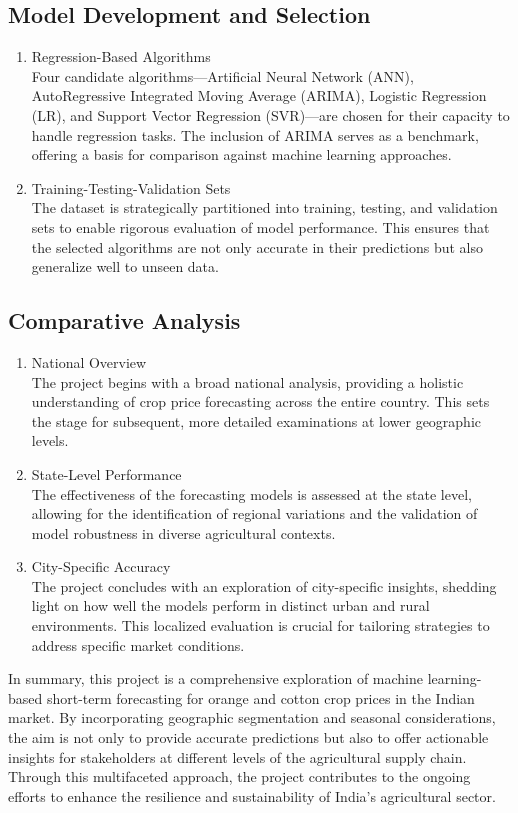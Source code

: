 \subsection{Model Development and Selection}
    \begin{enumerate}
        \item Regression-Based Algorithms\\
            Four candidate algorithms—Artificial Neural Network (ANN), AutoRegressive Integrated Moving Average (ARIMA), Logistic Regression (LR), and Support Vector Regression (SVR)—are chosen for their capacity to handle regression tasks. The inclusion of ARIMA serves as a benchmark, offering a basis for comparison against machine learning approaches.
        \item Training-Testing-Validation Sets\\
            The dataset is strategically partitioned into training, testing, and validation sets to enable rigorous evaluation of model performance. This ensures that the selected algorithms are not only accurate in their predictions but also generalize well to unseen data.        
    \end{enumerate}

\subsection{Comparative Analysis}
    \begin{enumerate}
        \item National Overview\\
            The project begins with a broad national analysis, providing a holistic understanding of crop price forecasting across the entire country. This sets the stage for subsequent, more detailed examinations at lower geographic levels.
        \item State-Level Performance\\
            The effectiveness of the forecasting models is assessed at the state level, allowing for the identification of regional variations and the validation of model robustness in diverse agricultural contexts.
        \item City-Specific Accuracy\\
            The project concludes with an exploration of city-specific insights, shedding light on how well the models perform in distinct urban and rural environments. This localized evaluation is crucial for tailoring strategies to address specific market conditions.            
    \end{enumerate}
    In summary, this project is a comprehensive exploration of machine learning-based short-term forecasting for orange and cotton crop prices in the Indian market. By incorporating geographic segmentation and seasonal considerations, the aim is not only to provide accurate predictions but also to offer actionable insights for stakeholders at different levels of the agricultural supply chain. Through this multifaceted approach, the project contributes to the ongoing efforts to enhance the resilience and sustainability of India's agricultural sector.